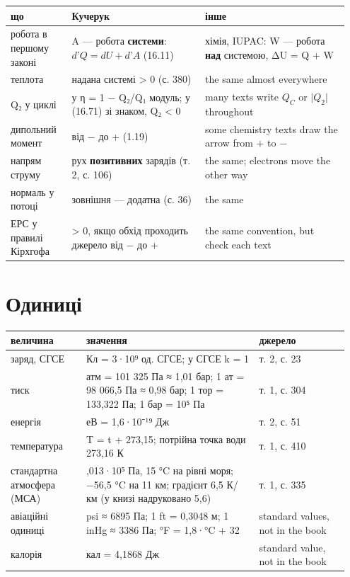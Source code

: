 \documentclass[11pt,a4paper,oneside]{book}
\begin{document}
{\small
\begin{longtable}{>{\raggedright\arraybackslash}p{0.170\linewidth}>{\raggedright\arraybackslash}p{0.376\linewidth}>{\raggedright\arraybackslash}p{0.406\linewidth}}
\toprule
\textbf{що} & \textbf{Кучерук} & \textbf{інше} \\
\midrule
\endhead
робота в першому законі & A — робота \textbf{системи}: $d\text{'}Q = dU + d\text{'}A$ (16.11) & хімія, IUPAC: W — робота \textbf{над} системою, ΔU = Q + W \\
теплота & надана системі > 0 (с. 380) & the same almost everywhere \\
Q₂ у циклі & у η = 1 − Q₂/Q₁ модуль; у (16.71) зі знаком, Q₂ < 0 & many texts write $Q_C$ or $\lvert Q_2\rvert$ throughout \\
дипольний момент & від − до + (1.19) & some chemistry texts draw the arrow from + to − \\
напрям струму & рух \textbf{позитивних} зарядів (т. 2, с. 106) & the same; electrons move the other way \\
нормаль у потоці & зовнішня — додатна (с. 36) & the same \\
ЕРС у правилі Кірхгофа & > 0, якщо обхід проходить джерело від − до + & the same convention, but check each text \\
\bottomrule
\end{longtable}
}

\section*{Одиниці}

{\small
\begin{longtable}{>{\raggedright\arraybackslash}p{0.210\linewidth}>{\raggedright\arraybackslash}p{0.484\linewidth}>{\raggedright\arraybackslash}p{0.258\linewidth}}
\toprule
\textbf{величина} & \textbf{значення} & \textbf{джерело} \\
\midrule
\endhead
заряд, СГСЕ & 1 Кл = 3·10⁹ од. СГСЕ; у СГСЕ k = 1 & т. 2, с. 23 \\
тиск & 1 атм = 101 325 Па ≈ 1,01 бар; 1 ат = 98 066,5 Па ≈ 0,98 бар; 1 тор = 133,322 Па; 1 бар = 10⁵ Па & т. 1, с. 304 \\
енергія & 1 еВ = 1,6·10⁻¹⁹ Дж & т. 2, с. 51 \\
температура & T = t + 273,15; потрійна точка води 273,16 К & т. 1, с. 410 \\
стандартна атмосфера (МСА) & 1,013·10⁵ Па, 15 °C на рівні моря; −56,5 °C на 11 км; градієнт 6,5 К/км (у книзі надруковано 5,6) & т. 1, с. 335 \\
авіаційні одиниці & 1 psi ≈ 6895 Па; 1 ft = 0,3048 м; 1 inHg ≈ 3386 Па; °F = 1,8·°C + 32 & standard values, not in the book \\
калорія & 1 кал = 4,1868 Дж & standard value, not in the book \\
\bottomrule
\end{longtable}
}
\end{document}
